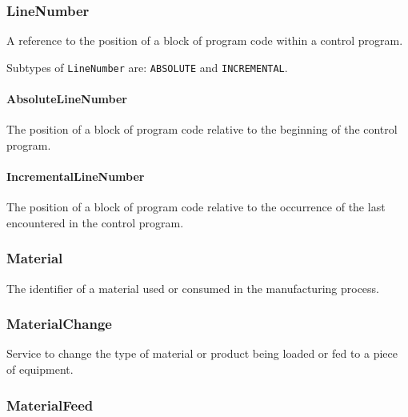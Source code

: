 \FloatBarrier

\subsubsection{LineNumber}
\label{sec:LineNumber}



A reference to the position of a block of program code within a control program.


Subtypes of \texttt{LineNumber} are: \texttt{ABSOLUTE} and \texttt{INCREMENTAL}. 
\FloatBarrier

\paragraph{AbsoluteLineNumber}\mbox{}
\label{sec:AbsoluteLineNumber}



The position of a block of program code relative to the beginning of the control program.


\paragraph{IncrementalLineNumber}\mbox{}
\label{sec:IncrementalLineNumber}



The position of a block of program code relative to the occurrence of the last  encountered in the control program.


\subsubsection{Material}
\label{sec:Material}



The identifier of a material used or consumed in the manufacturing process.

\FloatBarrier

\subsubsection{MaterialChange}
\label{sec:MaterialChange}



Service to change the type of material or product being loaded or fed to a piece of equipment.

\FloatBarrier

\subsubsection{MaterialFeed}
\label{sec:MaterialFeed}



